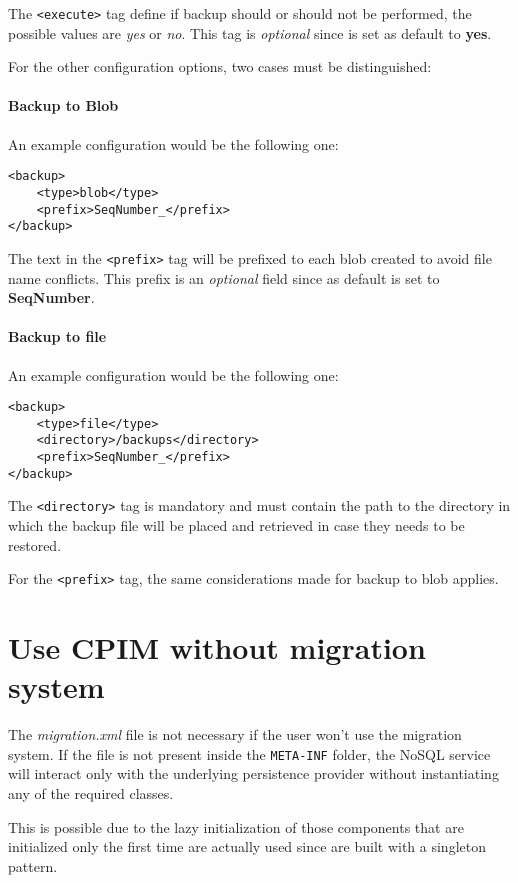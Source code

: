 \noindent The \texttt{<execute>} tag define if backup should or should not be performed, the possible values are \textit{yes} or \textit{no}. This tag is \textit{optional} since is set as default to \textbf{yes}.

\newparagraph For the other configuration options, two cases must be distinguished:

\paragraph{Backup to Blob} An example configuration would be the following one:
\begin{verbatim}
<backup>
    <type>blob</type>
    <prefix>SeqNumber_</prefix>
</backup>
\end{verbatim}

\noindent The text in the \texttt{<prefix>} tag will be prefixed to each blob created to avoid file name conflicts.
This prefix is an \textit{optional} field since as default is set to \textbf{SeqNumber\textunderscore}.

\paragraph{Backup to file} An example configuration would be the following one:
\begin{verbatim}
<backup>
    <type>file</type>
    <directory>/backups</directory>
    <prefix>SeqNumber_</prefix>
</backup>
\end{verbatim}

\noindent The \texttt{<directory>} tag is mandatory and must contain the path to the directory in which the backup file will be placed and retrieved in case they needs to be restored.

\noindent For the \texttt{<prefix>} tag, the same considerations made for backup to blob applies.

\section{Use CPIM without migration system}
The \textit{migration.xml} file is not necessary if the user won't use the migration system. If the file is not present inside the \texttt{META-INF} folder, the NoSQL service will interact only with the underlying persistence provider without instantiating any of the required classes.

\noindent This is possible due to the lazy initialization of those components that are initialized only the first time are actually used since are built with a singleton pattern.